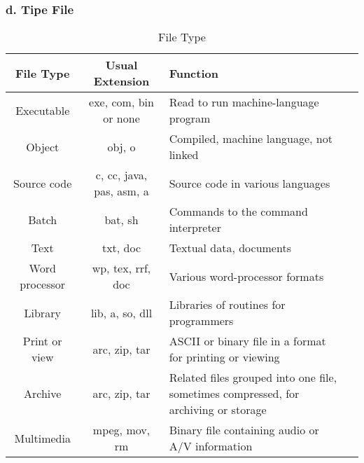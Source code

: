 \documentclass[12pt]{article}
\begin{document}
\subsubsection*{d. Tipe File}

\begin{table}[htbp] %
    \centering
    \begin{tabular}{|c|c|p{4cm}|p{7cm}|} %
    \hline
\textbf{File Type}      & \textbf{Usual Extension}        & \textbf {Function}                                                      \\ \hline
Executable              & exe, com, bin or none           & Read to run machine-language program                                    \\ \hline
Object                  & obj, o                          & Compiled, machine language, not linked                                  \\ \hline
Source code             & c, cc, java, pas, asm, a        & Source code in various languages                                        \\ \hline
Batch                   & bat, sh                         & Commands to the command interpreter                                     \\ \hline
Text                    & txt, doc                        & Textual data, documents                                                 \\ \hline
Word processor          & wp, tex, rrf, doc               & Various word-processor formats                                          \\ \hline
Library                 & lib, a, so, dll                 & Libraries of routines for programmers                                   \\ \hline
Print or view           & arc, zip, tar                   & ASCII or binary file in a format for printing or viewing                \\ \hline
Archive                 & arc, zip, tar                   & Related files grouped into one file, sometimes compressed, for archiving or storage \\ \hline
Multimedia              & mpeg, mov, rm                   & Binary file containing audio or A/V information                         \\ \hline
\end{tabular}
    \caption{File Type}
    \label{tab:your_label}
\end{table}
     
\end{document}
